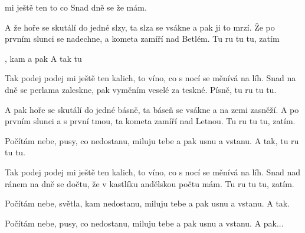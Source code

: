 

\zs
	  mi ještě ten  
	to  co   
	Snad  dně se 
	že   mám. 
	 
\ks

\zs
	A že hoře se skutálí do jedné slzy,
	ta slza se vsákne a pak ji to mrzí.
	Že po prvním slunci se nadechne,
	a kometa zamíří nad Betlém.
	Tu ru tu tu, zatím
\ks

\zr
	  , kam 
	  a pak  
	A tak   tu  
	   
\kr

\zs
	Tak podej podej mi ještě ten kalich,
	to víno, co s nocí se měnívá na líh.
	Snad na dně se perlama zaleskne,
	pak vyměním veselé za teskné.
	Písně, tu ru tu tu.
\ks

\zs
	A pak hoře se skutálí do jedné básně,
	ta báseň se vsákne a na zemi zasněží.
	A po prvním slunci a s první tmou,
	ta kometa zamíří nad Letnou.
	Tu ru tu tu, zatím.
\ks

\zr
	Počítám nebe, pusy, co nedostanu,
	miluju tebe a pak usnu a vstanu.
	A tak, tu ru tu tu.
\kr

\zs
	Tak podej podej mi ještě ten kalich,
	to víno, co s nocí se měnívá na líh.
	Snad nad ránem na dně se dočtu,
	že v kastlíku andělskou počtu mám.
	Tu ru tu tu, zatím.
\ks

\zr
	Počítám nebe, světla, kam nedostanu,
	miluju tebe a pak usnu a vstanu.
	A tak.

	Počítám nebe, pusy, co nedostanu,
	miluju tebe a pak usnu a vstanu.
	A pak...
\kr

\kp

